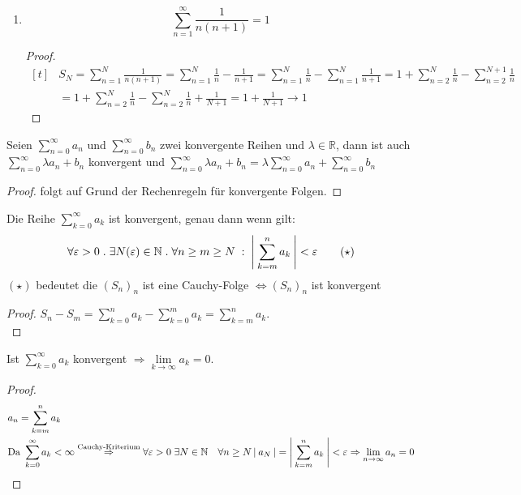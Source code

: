 \documentclass[a4paper,titlepage,oneside]{article}
\def\N{\ensuremath{\mathbb{N}} }
\def\R{\ensuremath{\mathbb{R}} }
\renewcommand{\epsilon}{\ensuremath{\varepsilon} }
\def\sp{\hspace{0,1cm}}
\def\spdot{\sp.\sp}
\def\spcolon{\sp:\sp}
\newcommand{\suminf}[2][n]{\ensuremath{\sum_{#1= 0}^{\infty}{#2}}}
\newcommand{\Suminf}[2][n]{\ensuremath{\sum_{#1=1}^{\infty}{#2}}}
\renewcommand{\liminf}[2][n]{\ensuremath{\lim\limits_{#1 \rightarrow \infty}{#2}}}
\newcommand{\abs}[1]{\ensuremath{\left|\:#1\:\right|}}
\theoremstyle{thmstyle}
\begin{document}
\begin{subbsp}
\begin{enumerate}
\begin{proof}
Würde \((S_N)_{N\ge1}\) konvergieren, dann auch die Teilfolge \((S_{2^N})_{N \ge 1}\), da diese dievergiert, divergiert auch \((S_N)_N\)\\
\end{proof}

\item
\[ \Suminf{\frac{1}{n(n+1)}}= 1 \]

\begin{proof}
\[\begin{aligned}[t]
&S_N = \sum_{n=1}^{N}{\frac{1}{n(n+1)}} = \sum_{n=1}^{N}{\frac{1}{n}} - \frac{1}{n+1} = \sum_{n=1}^{N}{\frac{1}{n}} - \sum_{n=1}^{N}{\frac{1}{n+1}}
= 1 + \sum_{n=2}^{N}{\frac{1}{n}} - \sum_{n=2}^{N+1}{\frac{1}{n}} \\
&= 1 + \sum_{n=2}^{N}{\frac{1}{n}} - \sum_{n=2}^{N}{\frac{1}{n}} + \frac{1}{N+1}
= 1 + \frac{1}{N+1} \longrightarrow 1
\end{aligned}\]
\end{proof}

\end{enumerate}
\end{subbsp}

\begin{subsatz}
Seien \suminf{a_n} und \suminf{b_n} zwei konvergente Reihen und \(\lambda \in \R\),
dann ist auch \(\suminf{\lambda a_n + b_n}\) konvergent und \(\suminf{\lambda a_n + b_n} = \lambda \suminf{a_n} + \suminf{b_n}\)
\begin{proof}
folgt auf Grund der Rechenregeln für konvergente Folgen.
\end{proof}
\end{subsatz}

\begin{subsatz}
Die Reihe \(\suminf[k]{a_k}\) ist konvergent, genau dann wenn gilt:
\[\forall \epsilon > 0 \spdot \exists N(\epsilon) \in \N \spdot \forall n \ge m \ge N \spcolon \abs{\sum_{k=m}^{n}{a_k}} < \epsilon \qquad (\star)\]
\((\star)\) bedeutet die \((S_n)_n\) ist eine Cauchy-Folge \(\Leftrightarrow (S_n)_n\) ist konvergent
\begin{proof}
\(S_n - S_m = \sum_{k=0}^{n}{a_k} - \sum_{k=0}^{m}{a_k} = \sum_{k=m}^{n}{a_k}\).\\
\end{proof}
\end{subsatz}

\begin{subkorr}
Ist \suminf[k]{a_k} konvergent \(\Rightarrow \liminf[k]{a_k} = 0\).
\begin{proof}
\[\begin{aligned}[t]
&a_n = \sum_{k = m}^{n}{a_k} \\
&\text{Da } \suminf[k]{a_k} < \infty \overset{\text{Cauchy-Kriterium}}{\Rightarrow} \forall \epsilon > 0 \sp \exists N \in \N \quad \forall n \ge N \abs{a_N} = \abs{ \sum_{k = m}^{n}{a_k}} < \epsilon \Rightarrow \liminf{a_n} = 0\\
\end{aligned}\]
\end{proof}
\end{subkorr}
\end{document}
